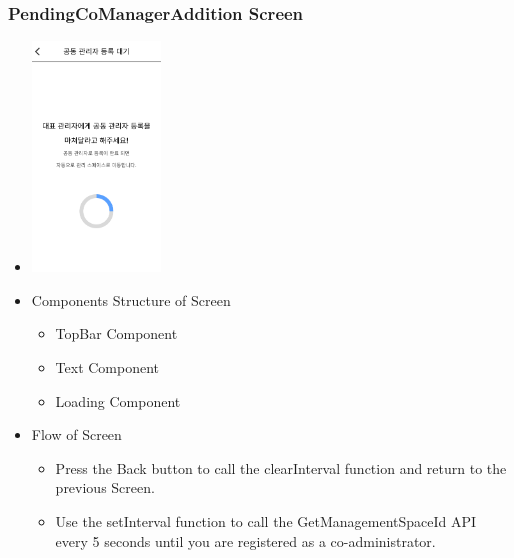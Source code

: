 \documentclass[conference]{IEEEtran}
\begin{document}
\subsubsection{PendingCoManagerAddition Screen}
\begin{itemize}
    \item[] \includegraphics[width=0.27\textwidth]{img/D/9.png}
    \item Components Structure of Screen
    \begin{itemize}
        \item TopBar Component
        \item Text Component
        \item Loading Component
    \end{itemize}
    \item Flow of Screen
    \begin{itemize}
        \item Press the Back button to call the clearInterval function and return to the previous Screen.
        \item Use the setInterval function to call the GetManagementSpaceId API every 5 seconds until you are registered as a co-administrator.
        \\
    \end{itemize}
\end{itemize}
\newpage
\end{document}
